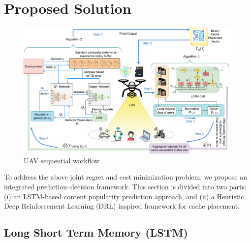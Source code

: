 \documentclass[journal]{IEEEtran}
\begin{document}
\section{Proposed Solution}

\begin{figure}
    \includegraphics[width=\textwidth]{Diagrams/UAV_workflow (2) (1).pdf}
        \caption{UAV sequential workflow}
        \label{fig:uav_sequential_workflow}
\end{figure}

To address the above joint regret and cost minimization problem, we propose an integrated prediction–decision framework. This section is divided into two parts: (i) an LSTM-based content popularity prediction approach, and (ii) a Heuristic Deep Reinforcement Learning (DRL) inspired framework for cache placement.


\subsection{Long Short Term Memory (LSTM)}
\end{document}
